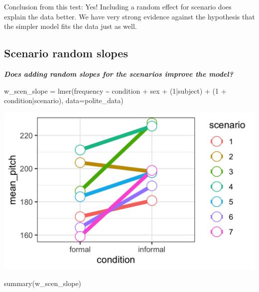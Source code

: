 \documentclass[
  openany]{book}
\newenvironment{Shaded}{\begin{snugshade}}{\end{snugshade}}
\newcommand{\AttributeTok}[1]{\textcolor[rgb]{0.77,0.63,0.00}{#1}}
\newcommand{\DecValTok}[1]{\textcolor[rgb]{0.00,0.00,0.81}{#1}}
\newcommand{\FunctionTok}[1]{\textcolor[rgb]{0.00,0.00,0.00}{#1}}
\newcommand{\NormalTok}[1]{#1}
\newcommand{\OtherTok}[1]{\textcolor[rgb]{0.56,0.35,0.01}{#1}}
\newcommand{\SpecialCharTok}[1]{\textcolor[rgb]{0.00,0.00,0.00}{#1}}
\begin{document}
Conclusion from this test: Yes! Including a random effect for scenario does explain the data better. We have very strong evidence against the hypothesis that the simpler model fits the data just as well.

\hypertarget{scenario-random-slopes}{%
\subsection{Scenario random slopes}\label{scenario-random-slopes}}

\textbf{\emph{Does adding random slopes for the scenarios improve the model?}}

\begin{Shaded}
\begin{Highlighting}[]
\NormalTok{w\_scen\_slope }\OtherTok{=} 
  \FunctionTok{lmer}\NormalTok{(frequency }\SpecialCharTok{\textasciitilde{}}\NormalTok{ condition }\SpecialCharTok{+} 
\NormalTok{                  sex }\SpecialCharTok{+}\NormalTok{ (}\DecValTok{1}\SpecialCharTok{|}\NormalTok{subject) }\SpecialCharTok{+} 
\NormalTok{                  (}\DecValTok{1} \SpecialCharTok{+}\NormalTok{ condition}\SpecialCharTok{|}\NormalTok{scenario), }
       \AttributeTok{data=}\NormalTok{polite\_data)}
\end{Highlighting}
\end{Shaded}

\includegraphics[width=16.67in]{images/m3/scenario_slopes}

\begin{Shaded}
\begin{Highlighting}[]
\FunctionTok{summary}\NormalTok{(w\_scen\_slope)}
\end{Highlighting}
\end{Shaded}
\end{document}

